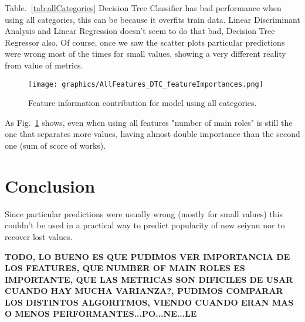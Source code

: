 Table.~\ref{tab:allCategories} Decision Tree Classifier has bad performance when using all categories, this can be because it overfits train data. Linear Discriminant Analysis and Linear Regression doesn't seem to do that bad, Decision Tree Regressor also. Of course, once we saw the scatter plots particular predictions were wrong most of the times for small values, showing a very different reality from value of metrics.

\begin{figure}[!hbt]
	\centering
	\texttt{[image: graphics/AllFeatures\_DTC\_featureImportances.png]}
	\caption{Feature information contribution for model using all categories.}
	\label{fig:DTC_All}
\end{figure}

As Fig.~\ref{fig:DTC_All} shows, even when using all features "number of main roles" is still the one that separates more values, having almost double importance than the second one (sum of score of works).

\section{Conclusion}

Since particular predictions were usually wrong (mostly for small values) this couldn't be used in a practical way to predict popularity of new seiyuu nor to recover lost values. 

\textbf{TODO, LO BUENO ES QUE PUDIMOS VER IMPORTANCIA DE LOS FEATURES, QUE NUMBER OF MAIN ROLES ES IMPORTANTE, QUE LAS METRICAS SON DIFICILES DE USAR CUANDO HAY MUCHA VARIANZA?, PUDIMOS COMPARAR LOS DISTINTOS ALGORITMOS, VIENDO CUANDO ERAN MAS O MENOS PERFORMANTES...PO...NE...LE}
